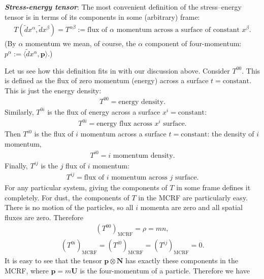 \documentclass[11pt,letterpaper]{book}
\begin{document}
    \textit{\textbf{Stress-energy tensor}}:
    The most convenient definition of the stress–energy tensor is in terms of its components in some (arbitrary) frame:
    \begin{align}
    T(\tilde{d}x^\alpha, \tilde{d}x^\beta) = T^{\alpha\beta} := \text{flux of \(\alpha\) momentum across a surface of constant \(x^\beta\)}. \tag{4.14}
    \end{align}
    (By \(\alpha\) momentum we mean, of course, the \(\alpha\) component of four-momentum: \(p^\alpha := \langle \tilde{d}x^\alpha, \mathbf{p} \rangle\).)

    Let us see how this definition fits in with our discussion above. Consider \(T^{00}\). This is defined as the flux of zero momentum (energy) across a surface \(t = \text{constant}\). This is just the energy density:
    \begin{align}
    T^{00} = \text{energy density}. \tag{4.15}
    \end{align}
    Similarly, \(T^{0i}\) is the flux of energy across a surface \(x^i = \text{constant}\):
    \begin{align}
    T^{0i} = \text{energy flux across \(x^i\) surface}. \tag{4.16}
    \end{align}
    Then \(T^{i0}\) is the flux of \(i\) momentum across a surface \(t = \text{constant}\): the density of \(i\) momentum,
    \begin{align}
    T^{i0} = \text{\(i\) momentum density}. \tag{4.17}
    \end{align}
    Finally, \(T^{ij}\) is the \(j\) flux of \(i\) momentum:
    \begin{align}
    T^{ij} = \text{flux of \(i\) momentum across \(j\) surface}. \tag{4.18}
    \end{align}
    For any particular system, giving the components of \(T\) in some frame defines it completely. For dust, the components of \(T\) in the MCRF are particularly easy. There is no motion of the particles, so all \(i\) momenta are zero and all spatial fluxes are zero. Therefore
    \begin{align}
    (T^{00})_{\text{MCRF}} = \rho = mn,
    \end{align}
    \begin{align}
    (T^{0i})_{\text{MCRF}} = (T^{i0})_{\text{MCRF}} = (T^{ij})_{\text{MCRF}} = 0.
    \end{align}
    It is easy to see that the tensor \(\mathbf{p} \otimes \mathbf{N}\) has exactly these components in the MCRF, where \(\mathbf{p} = m\mathbf{U}\) is the four-momentum of a particle. Therefore we have
\end{document}
